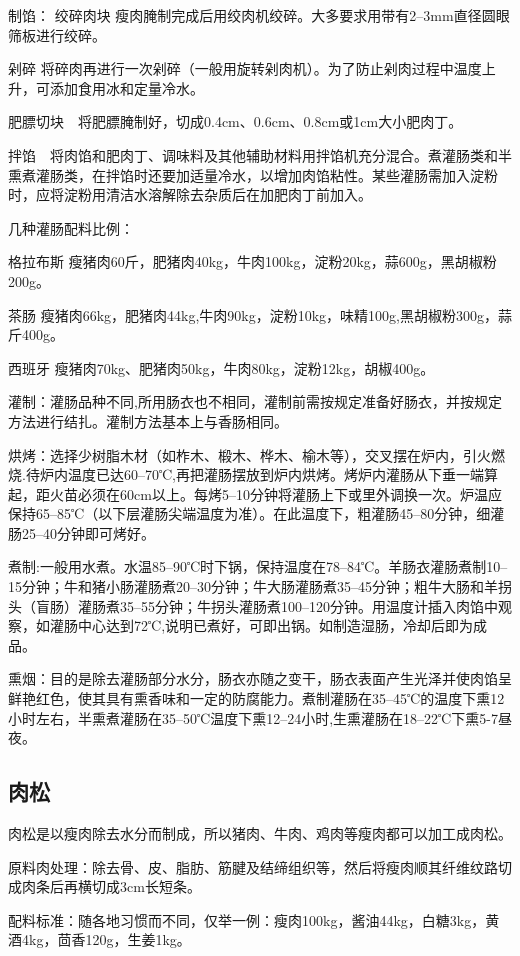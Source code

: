 \documentclass{ctexbook}
\begin{document}
制馅：
绞碎肉块 瘦肉腌制完成后用绞肉机绞碎。大多要求用带有2--3mm直径圆眼筛板进行绞碎。

剁碎 将碎肉再进行一次剁碎（一般用旋转剁肉机）。为了防止剁肉过程中温度上升，可添加食用冰和定量冷水。

肥膘切块　将肥膘腌制好，切成0.4cm、0.6cm、0.8cm或1cm大小肥肉丁。

拌馅　将肉馅和肥肉丁、调味料及其他辅助材料用拌馅机充分混合。煮灌肠类和半熏煮灌肠类，在拌馅时还要加适量冷水，以增加肉馅粘性。某些灌肠需加入淀粉时，应将淀粉用清洁水溶解除去杂质后在加肥肉丁前加入。

几种灌肠配料比例：

格拉布斯 瘦猪肉60斤，肥猪肉40kg，牛肉100kg，淀粉20kg，蒜600g，黑胡椒粉200g。

茶肠 瘦猪肉66kg，肥猪肉44kg,牛肉90kg，淀粉10kg，味精100g,黑胡椒粉300g，蒜斤400g。

西班牙 瘦猪肉70kg、肥猪肉50kg，牛肉80kg，淀粉12kg，胡椒400g。

灌制：灌肠品种不同,所用肠衣也不相同，灌制前需按规定准备好肠衣，并按规定方法进行结扎。灌制方法基本上与香肠相同。

烘烤：选择少树脂木材（如柞木、椴木、桦木、榆木等），交叉摆在炉内，引火燃烧.待炉内温度已达60--70℃,再把灌肠摆放到炉内烘烤。烤炉内灌肠从下垂一端算起，距火苗必须在60cm以上。每烤5--10分钟将灌肠上下或里外调换一次。炉温应保持65--85℃（以下层灌肠尖端温度为准）。在此温度下，粗灌肠45--80分钟，细灌肠25--40分钟即可烤好。

煮制:一般用水煮。水温85--90℃时下锅，保持温度在78--84℃。羊肠衣灌肠煮制10--15分钟；牛和猪小肠灌肠煮20--30分钟；牛大肠灌肠煮35--45分钟；粗牛大肠和羊拐头（盲肠）灌肠煮35--55分钟；牛拐头灌肠煮100--120分钟。用温度计插入肉馅中观察，如灌肠中心达到72℃,说明已煮好，可即出锅。如制造湿肠，冷却后即为成品。

熏烟：目的是除去灌肠部分水分，肠衣亦随之变干，肠衣表面产生光泽并使肉馅呈鲜艳红色，使其具有熏香味和一定的防腐能力。煮制灌肠在35--45℃的温度下熏12小时左右，半熏煮灌肠在35--50℃温度下熏12--24小时,生熏灌肠在18--22℃下熏5-7昼夜。


\subsection{肉松}
肉松是以瘦肉除去水分而制成，所以猪肉、牛肉、鸡肉等瘦肉都可以加工成肉松。

原料肉处理：除去骨、皮、脂肪、筋腱及结缔组织等，然后将瘦肉顺其纤维纹路切成肉条后再横切成3cm长短条。

配料标准：随各地习惯而不同，仅举一例：瘦肉100kg，酱油44kg，白糖3kg，黄酒4kg，茴香120g，生姜1kg。
\end{document}
